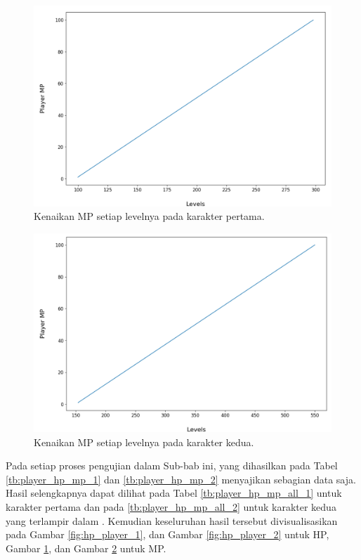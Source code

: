 \begin{figure} [!h] \centering
	\includegraphics[scale=0.42]{img/PlayerMpDistrib1.png}
	\caption{Kenaikan MP setiap levelnya pada karakter pertama.}
	\label{fig:mp_player_1}
\end{figure}
\vspace{1ex}

\begin{figure} [!h] \centering
	\includegraphics[scale=0.42]{img/PlayerMpDistrib2.png}
	\caption{Kenaikan MP setiap levelnya pada karakter kedua.}
	\label{fig:mp_player_2}
\end{figure}

Pada setiap proses pengujian dalam Sub-bab ini, yang dihasilkan pada Tabel \ref{tb:player_hp_mp_1} dan \ref{tb:player_hp_mp_2} menyajikan sebagian data saja. Hasil selengkapnya dapat dilihat pada Tabel \ref{tb:player_hp_mp_all_1} untuk karakter pertama dan pada \ref{tb:player_hp_mp_all_2} untuk karakter kedua yang terlampir dalam . Kemudian keseluruhan hasil tersebut divisualisasikan pada Gambar \ref{fig:hp_player_1}, dan Gambar \ref{fig:hp_player_2} untuk HP, Gambar \ref{fig:mp_player_1}, dan Gambar \ref{fig:mp_player_2} untuk MP.
\vspace{1ex}

